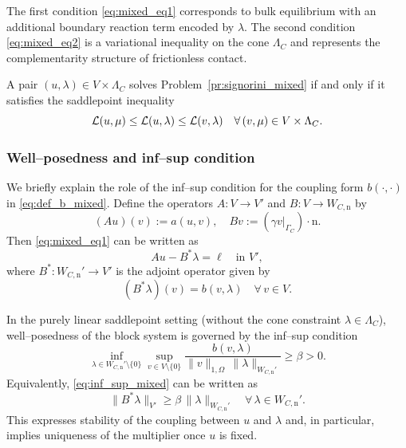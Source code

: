 The first condition \eqref{eq:mixed_eq1} corresponds to bulk equilibrium with an additional boundary reaction term encoded by $\lambda$.
The second condition \eqref{eq:mixed_eq2} is a variational inequality on the cone $\Lambda_C$ and represents the complementarity structure of frictionless contact.

\begin{remark}\label{rem:saddlepoint_property}
	A pair $(u,\lambda)\in V\times\Lambda_C$ solves Problem~\ref{pr:signorini_mixed} if and only if it satisfies the saddlepoint inequality
	\begin{equation}\label{eq:saddlepoint}
		{\mathcal L}(u,\mu)\le {\mathcal L}(u,\lambda)\le {\mathcal L}(v,\lambda)\quad \forall \,(v,\mu)\in V\times\Lambda_C.
	\end{equation}
\end{remark}


\subsubsection{Well--posedness and inf--sup condition}

We briefly explain the role of the inf--sup condition for the coupling form $b(\cdot,\cdot)$ in \eqref{eq:def_b_mixed}.
Define the operators $A:V\to V'$ and $B:V\to W_{C,\mathrm n}$ by
\begin{equation}\label{eq:def_operators_AB}
	(Au)(v):=a(u,v),\quad Bv:= (\gamma v|_{\Gamma_C})\cdot \mathrm n.
\end{equation}
Then \eqref{eq:mixed_eq1} can be written as
\begin{equation}\label{eq:first_equation_operator}
	Au-B^*\lambda=\ell \quad \text{in }V',
\end{equation}
where $B^*:W_{C,\mathrm n}'\to V'$ is the adjoint operator given by
\begin{equation}\label{eq:def_B_adjoint_mixed}
	(B^*\lambda)(v)=b(v,\lambda)\quad \forall\, v\in V.
\end{equation}

In the purely linear saddlepoint setting (without the cone constraint $\lambda\in\Lambda_C$), well--posedness of the block system is governed by the inf--sup condition
\begin{equation}\label{eq:inf_sup_mixed}
	\inf_{\lambda\in W_{C,\mathrm n}'\setminus\{0\}}
	\sup_{v\in V\setminus\{0\}}
	\frac{b(v,\lambda)}{\|v\|_{1,\Omega}\,\|\lambda\|_{W_{C,\mathrm n}'}}
	\ge \beta>0.
\end{equation}
Equivalently, \eqref{eq:inf_sup_mixed} can be written as
\begin{equation}\label{eq:inf_sup_equiv}
	\|B^*\lambda\|_{V'}\ge \beta\,\|\lambda\|_{W_{C,\mathrm n}'}\quad \forall\, \lambda\in W_{C,\mathrm n}'.
\end{equation}
This expresses stability of the coupling between $u$ and $\lambda$ and, in particular, implies uniqueness of the multiplier once $u$ is fixed.

